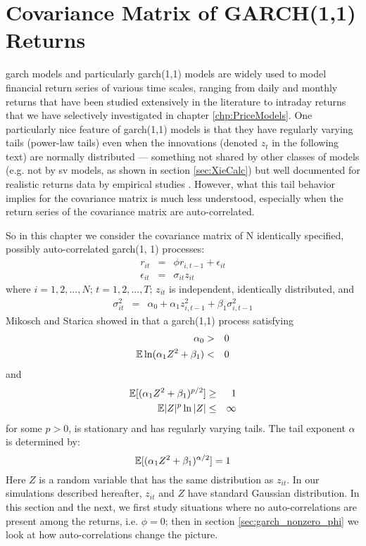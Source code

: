 \documentclass{report}
\begin{document}
\chapter{Covariance Matrix of GARCH(1,1) Returns}
\label{chp:CrossCorrelationFat}
\gls{garch} models and particularly \gls{garch}(1,1) models are widely used to
model financial return series of various time scales, ranging from
daily and monthly returns that have been studied extensively in the
literature to intraday returns that we have selectively investigated
in chapter \ref{chp:PriceModels}. One particularly nice feature of
\gls{garch}(1,1) models is that they have regularly varying tails (power-law
tails) \cite{Mikosch2009, mikosch2000} even when the innovations
(denoted $z_t$ in the following text) are normally distributed ---
something not shared by other classes of models (e.g. not by
\gls{sv} models, as shown in section \ref{sec:XieCalc}) but well
documented for realistic returns data by empirical studies
\cite{Mantegna2000, Potters2003, Guhr2007}. However, what this tail
behavior implies for the covariance matrix is much less understood,
especially when the return series of the covariance matrix are
auto-correlated.

So in this chapter we consider the covariance matrix of N
identically specified, possibly auto-correlated \gls{garch}(1, 1)
processes:
\begin{eqnarray}
  r_{it} &=& \phi r_{i, t-1} + \epsilon_{it} \nonumber \\
  \epsilon_{it} &=& \sigma_{it} z_{it} \label{eq:garch_spec}
\end{eqnarray}
where $i=1,2,...,N$; $t=1,2,...,T$; $z_{it}$ is independent,
identically distributed, and
\begin{eqnarray*}
  \sigma_{it}^2 &=& \alpha_0 + \alpha_1 z_{i, t-1}^2 + \beta_1
  \sigma_{i,t-1}^2
\end{eqnarray*}
Mikosch and Starica showed in \cite{mikosch2000} that a
\gls{garch}(1,1) process satisfying
\begin{eqnarray*}
  \alpha_0 &>& 0 \\
  \mathbb{E}\ln(\alpha_1 Z^2 + \beta_1) &<& 0 \\
\end{eqnarray*}
and
\begin{eqnarray*}
  \mathbb{E}[(\alpha_1 Z^2 + \beta_1)^{p/2}] &\geq& 1 \\
  \mathbb{E}|Z|^p \ln|Z| &\leq& \infty
\end{eqnarray*}
for some $p > 0$, is stationary and has regularly varying tails. The
tail exponent $\alpha$ is determined by:
\begin{equation}\label{eq:garch_alpha}
  \mathbb{E}[(\alpha_1 Z^2 + \beta_1)^{\alpha/2}] = 1
\end{equation}
Here $Z$ is a random variable that has the same distribution as
$z_{it}$. In our simulations described hereafter, $z_{it}$ and $Z$
have standard Gaussian distribution. In this section and the next, we
first study situations where no auto-correlations are present among
the returns, i.e. $\phi = 0$; then in section \ref{sec:garch_nonzero_phi} we
look at how auto-correlations change the picture.
\end{document}
